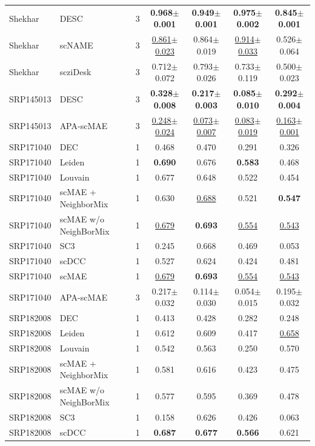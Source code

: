 \begin{table}[t]
\begin{tabular}{llrcccc}
Shekhar & DESC & 3 & \textbf{0.968$\pm$0.001} & \textbf{0.949$\pm$0.001} & \textbf{0.975$\pm$0.002} & \textbf{0.845$\pm$0.001} \\
Shekhar & scNAME & 3 & \underline{0.861$\pm$0.023} & 0.864$\pm$0.019 & \underline{0.914$\pm$0.033} & 0.526$\pm$0.064 \\
Shekhar & scziDesk & 3 & 0.712$\pm$0.072 & 0.793$\pm$0.026 & 0.733$\pm$0.119 & 0.500$\pm$0.023 \\
\midrule
SRP145013 & DESC & 3 & \textbf{0.328$\pm$0.008} & \textbf{0.217$\pm$0.003} & \textbf{0.085$\pm$0.010} & \textbf{0.292$\pm$0.004} \\
SRP145013 & APA-scMAE & 3 & \underline{0.248$\pm$0.024} & \underline{0.073$\pm$0.007} & \underline{0.083$\pm$0.019} & \underline{0.163$\pm$0.001} \\
\midrule
SRP171040 & DEC & 1 & 0.468 & 0.470 & 0.291 & 0.326 \\
SRP171040 & Leiden & 1 & \textbf{0.690} & 0.676 & \textbf{0.583} & 0.468 \\
SRP171040 & Louvain & 1 & 0.677 & 0.648 & 0.522 & 0.454 \\
SRP171040 & scMAE + NeighborMix & 1 & 0.630 & \underline{0.688} & 0.521 & \textbf{0.547} \\
SRP171040 & scMAE w/o NeighBorMix & 1 & \underline{0.679} & \textbf{0.693} & \underline{0.554} & \underline{0.543} \\
SRP171040 & SC3 & 1 & 0.245 & 0.668 & 0.469 & 0.053 \\
SRP171040 & scDCC & 1 & 0.527 & 0.624 & 0.424 & 0.481 \\
SRP171040 & scMAE & 1 & \underline{0.679} & \textbf{0.693} & \underline{0.554} & \underline{0.543} \\
SRP171040 & APA-scMAE & 3 & 0.217$\pm$0.032 & 0.114$\pm$0.030 & 0.054$\pm$0.015 & 0.195$\pm$0.032 \\
\midrule
SRP182008 & DEC & 1 & 0.413 & 0.428 & 0.282 & 0.248 \\
SRP182008 & Leiden & 1 & 0.612 & 0.609 & 0.417 & \underline{0.658} \\
SRP182008 & Louvain & 1 & 0.542 & 0.563 & 0.250 & 0.570 \\
SRP182008 & scMAE + NeighborMix & 1 & 0.581 & 0.616 & 0.423 & 0.475 \\
SRP182008 & scMAE w/o NeighBorMix & 1 & 0.577 & 0.595 & 0.369 & 0.478 \\
SRP182008 & SC3 & 1 & 0.158 & 0.626 & 0.426 & 0.063 \\
SRP182008 & scDCC & 1 & \textbf{0.687} & \textbf{0.677} & \textbf{0.566} & 0.621 \\

\end{tabular}
\end{table}
